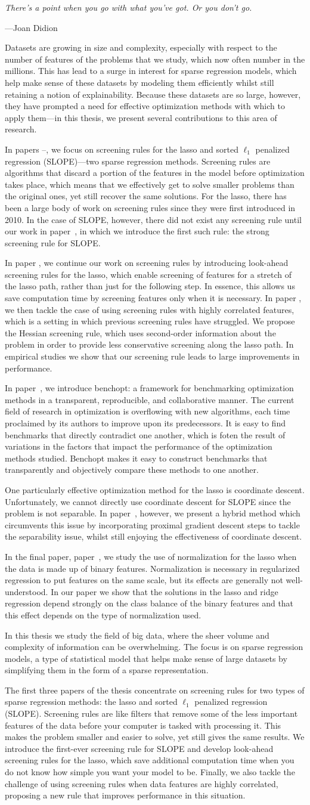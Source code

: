 \documentclass{book}
\newcommand{\myAbstract}{%
  Datasets are growing in size and complexity, especially with respect to the number of features of the problems that we study, which now often number in the millions. This has lead to a surge in interest for sparse regression models, which help make sense of these datasets by modeling them efficiently whilst still retaining a notion of explainability. Because these datasets are so large, however, they have prompted a need for effective optimization methods with which to apply them---in this thesis, we present several contributions to this area of research.

  In papers \I--\III, we focus on screening rules for the lasso and sorted \(\ell_1\) penalized regression (SLOPE)---two sparse regression methods. Screening rules are algorithms that discard a portion of the features in the model before optimization takes place, which means that we effectively get to solve smaller problems than the original ones, yet still recover the same solutions. For the lasso, there has been a large body of work on screening rules since they were first introduced in 2010. In the case of SLOPE, however, there did not exist any screening rule until our work in paper~\I, in which we introduce the first such rule: the strong screening rule for SLOPE.

  In paper \II, we continue our work on screening rules by introducing look-ahead screening rules for the lasso, which enable screening of features for a stretch of the lasso path, rather than just for the following step. In essence, this allows us save computation time by screening features only when it is necessary. In paper \III, we then tackle the case of using screening rules with highly correlated features, which is a setting in which previous screening rules have struggled. We propose the Hessian screening rule, which uses second-order information about the problem in order to provide less conservative screening along the lasso path. In empirical studies we show that our screening rule leads to large improvements in performance.

  In paper~\IV, we introduce benchopt: a framework for benchmarking optimization methods in a transparent, reproducible, and collaborative manner. The current field of research in optimization is overflowing with new algorithms, each time proclaimed by its authors to improve upon its predecessors. It is easy to find benchmarks that directly contradict one another, which is foten the result of variations in the factors that impact the performance of the optimization methods studied. Benchopt makes it easy to construct benchmarks that transparently and objectively compare these methods to one another.

  One particularly effective optimization method for the lasso is coordinate descent. Unfortunately, we cannot directly use coordinate descent for SLOPE since the problem is not separable. In paper~\V, however, we present a hybrid method which circumvents this issue by incorporating proximal gradient descent steps to tackle the separability issue, whilst still enjoying the effectiveness of coordinate descent.

  In the final paper, paper~\VI, we study the use of normalization for the lasso when the data is made up of binary features. Normalization is necessary in regularized regression to put features on the same scale, but its effects are generally not well-understood. In our paper we show that the solutions in the lasso and ridge regression depend strongly on the class balance of the binary features and that this effect depends on the type of normalization used.
}%
\begin{document}

\pagestyle{empty}




\newpage
\thispagestyle{empty} %

\setlength\epigraphrule{0pt}
\setlength{}

\null
\vspace{20ex}


\epigraph{\itshape
  There’s a point when you go with what you’ve got. Or you don’t go.
}{
  ---Joan Didion
}

\cleardoublepage

\pagestyle{headings}

\setcounter{page}{1} %
\setcounter{tocdepth}{1}

\tableofcontents
{}


\newpage


\newpage


\myAbstract


In this thesis we study the field of big data, where the sheer volume and complexity of information can be overwhelming. The focus is on sparse regression models, a type of statistical model that helps make sense of large datasets by simplifying them in the form of a sparse  representation.

The first three papers of the thesis concentrate on screening rules for two types of sparse regression methods: the lasso and sorted \(\ell_1\) penalized regression (SLOPE). Screening rules are like filters that remove some of the less important features of the data before your computer is tasked with processing it. This makes the problem smaller and easier to solve, yet still gives the same results. We introduce the first-ever screening rule for SLOPE and develop look-ahead screening rules for the lasso, which save additional computation time when you do not know how simple you want your model to be. Finally, we also tackle the challenge of using screening rules when data features are highly correlated, proposing a new rule that improves performance in this situation.
\end{document}
